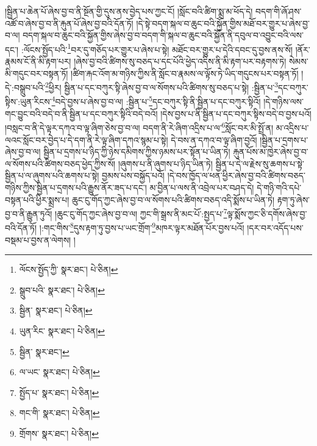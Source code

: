 །སྦྱིན་པ་ཆེན་པོ་ཞེས་བྱ་བ་ནི་སྔོན་གྱི་དུས་ནས་བྱེད་པས་ཀྱང་ངོ། །སློང་བའི་ཚིག་སྨྲ་མ་ཕོད་དེ། བདག་གི་ཞོ་ཤས་འཚོ་བ་ཞེས་བྱ་བ་ནི་རྐུན་པོ་ཞེས་བྱ་བའི་དོན་ཏོ། །དེ་སྟེ་བདག་སྐལ་བ་ཆུང་བའི་སྐྱོན་གྱིས་མཐོ་བར་གྱུར་པ་ཞེས་བྱ་བ་ལ། བདག་སྐལ་བ་ཆུང་བའི་སྐྱོན་གྱིས་ཞེས་བྱ་བ་བདག་གི་སྐལ་བ་ཆུང་བའི་སྐྱོན་ནི་དབུལ་བ་འབྱུང་བའི་ལས་དང་། :ལོངས་སྤྱོད་པའི་\footnote{ལོངས་སྤྱོད་ཀྱི་  སྣར་ཐང་།  པེ་ཅིན། }བར་དུ་གཅོད་པར་གྱུར་པ་ཞེས་པ་སྟེ། མཐོང་བར་གྱུར་པ་དེའི་དབང་དུ་བྱས་ནས་སོ། །ནོར་རྣམས་ངོ་ནི་མི་རྟག་པར། །ཞེས་བྱ་བའི་ཚིགས་སུ་བཅད་པ་དང་པོའི་ཕྱེད་འདིས་ནི་མི་རྟག་པར་བརྟགས་ཏེ། སེམས་མི་གདུང་བར་བསྟན་ཏོ། །ཚིག་རྐང་འོག་མ་གཉིས་ཀྱིས་ནི་སློང་བ་རྣམས་ལ་ལྟོས་ཏེ་ཡིད་གདུངས་པར་བསྟན་ཏོ། །དེ་:བསྒྲུབ་པའི་\footnote{སྒྲུབ་པའི་  སྣར་ཐང་།  པེ་ཅིན། }ཕྱིར། སྦྱིན་པ་དང་བཀུར་སྟི་ཞེས་བྱ་བ་ལ་སོགས་པའི་ཚིགས་སུ་བཅད་པ་སྟེ། :སྦྱིན་པ་\footnote{སྦྱིན་  སྣར་ཐང་།  པེ་ཅིན། }དང་བཀུར་སྟིས་:ཡུན་རིངས་\footnote{ཡུན་རིང་  སྣར་ཐང་།  པེ་ཅིན། }བདེ་བྱས་པ་ཞེས་བྱ་བ་ལ། :སྦྱིན་པ་\footnote{སྦྱིན་  སྣར་ཐང་། }དང་བཀུར་སྟི་ནི་སྦྱིན་པ་དང་བཀུར་སྟིའོ། །དེ་གཉིས་ལས་གང་བྱུང་བའི་བདེ་བ་ནི་སྦྱིན་པ་དང་བཀུར་སྟིའི་བདེ་བའོ། །དེས་བྱས་པ་ནི་སྦྱིན་པ་དང་བཀུར་སྟིས་བདེ་བ་བྱས་པའོ། །བསླང་བ་ནི་དེ་ལྟར་དཀའ་བ་ལྟ་ཞིག་ཅེས་བྱ་བ་ལ། བདག་ནི་རེ་ཞིག་འདྲིས་པ་ལ་\footnote{ལ་ཡང་  སྣར་ཐང་།  པེ་ཅིན། }སློང་བར་མི་སྤྲོ་ན། མ་འདྲིས་པ་ལའང་སློང་བར་བྱེད་པ་དེ་དག་ནི་རེ་ལྟ་ཞིག་དཀའ་སྙམ་པ་སྟེ། དེ་བས་ན་དཀའ་བ་ལྟ་ཞིག་བྱའོ། །སྦྱིན་པ་དྲགས་པ་ཞེས་བྱ་བ་ལ། སྦྱིན་པ་དྲགས་པ་ཉིད་ཀྱི་ཉེས་དམིགས་ཀྱིས་ཉམས་པར་སྟོན་པ་ཡིན་ཏེ། རྐུན་པོས་མ་ཁྱེར་ཞེས་བྱ་བ་ལ་སོགས་པའི་ཚིགས་བཅད་ཕྱེད་ཀྱིས་སོ། །ཞུགས་པ་ནི་ཞུགས་པ་ཉིད་ཡིན་ཏེ། སྦྱིན་པ་དེ་ལ་རྗེས་སུ་ཆགས་པ་སྟེ་སྦྱིན་པ་ལ་ཞུགས་པའི་ཆགས་པ་སྟེ། བྱམས་པས་བསྐྱོད་པའོ། །དེ་བས་ཁྱོད་ལ་ཕན་ཕྱིར་ཞེས་བྱ་བའི་ཚིགས་བཅད་གཉིས་ཀྱིས་སྦྱིན་པ་དྲགས་པའི་རྒྱུས་ནོར་ཟད་པ་དང་། མ་བྱིན་པ་ལས་ནི་འབྲེལ་པར་བཤད་དེ། དེ་གཉི་གའི་དཔེ་བསྟན་པའི་ཕྱིར་སྨྲས་པ། ཆུང་ངུ་གོད་ཀྱང་ཞེས་བྱ་བ་ལ་སོགས་པའི་ཚིགས་བཅད་འདི་སྨོས་པ་ཡིན་ཏེ། རྟག་ཏུ་ཞེས་བྱ་བ་ནི་རྒྱུན་ཏུའོ། །ཆུང་ངུ་གོད་ཀྱང་ཞེས་བྱ་བ་ལ། ཀྱང་གི་སྒྲས་ནི་མང་པོ་:སྤྱད་པ་\footnote{སྤྱོད་པ་  སྣར་ཐང་།  པེ་ཅིན། }ལྟ་སྨོས་ཀྱང་ཅི་དགོས་ཞེས་བྱ་བའི་དོན་ཏོ། །:གང་གིས་\footnote{གང་གི་  སྣར་ཐང་།  པེ་ཅིན། }དུས་རྟག་ཏུ་བྱས་པ་ཡང་གྲོག་\footnote{གྲོགས་  སྣར་ཐང་།  པེ་ཅིན། }མཁར་ལྟར་མཐོན་པོར་བྱས་པའོ། །དར་བར་འདོད་པས་བསྡམ་པ་བྱས་ན་ལེགས། །
